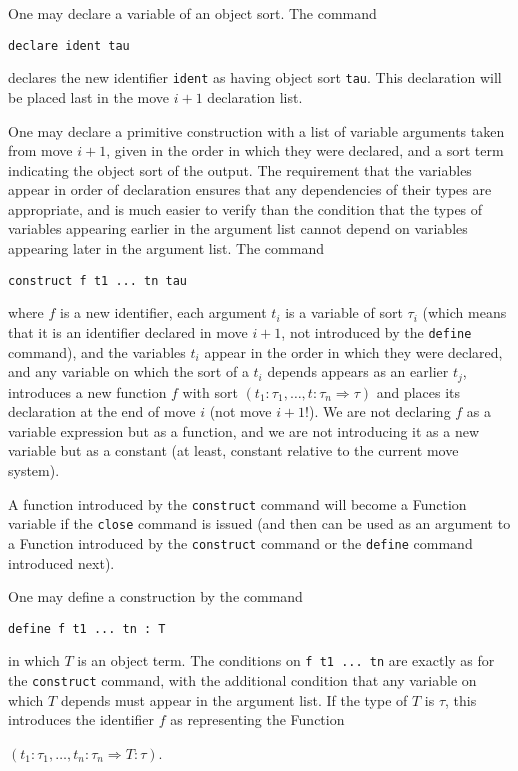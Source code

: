 \documentclass[12pt]{article}
\begin{document}
One may declare a variable of an object sort.  The command \begin{center}{\tt declare ident tau}\end{center} declares the new identifier {\tt ident} as having object sort {\tt tau}.  This declaration will be placed last in the move $i+1$ declaration list.

One may declare a primitive construction with a list of variable arguments taken from move $i+1$, given in the order in which they were declared, and a sort term indicating the object sort of the output.  The requirement that the variables appear in order of declaration ensures that any dependencies of their types are appropriate, and is much easier to verify than the condition that the types of variables appearing earlier in the argument list cannot depend on variables appearing later in the argument list.
The command \begin{center}{\tt construct f t1  ... tn tau}\end{center} where $f$ is a new identifier, each argument $t_i$ is a variable of sort $\tau_i$ (which means that it is an identifier declared in move $i+1$, not introduced by the {\tt define} command), and the variables $t_i$ appear in the order in which they were declared,  and any variable on which the sort of a $t_i$ depends appears as an earlier $t_j$,  introduces a new function $f$ with sort $(t_1:\tau_1,\ldots,t:\tau_n \Rightarrow \tau)$ and places its declaration at the end of move $i$ (not move $i+1$!).  We are not
declaring $f$ as a variable expression  but as a function, and we are not introducing it as a new variable but as a constant (at least, constant relative to the current move system).

A function introduced by the {\tt construct\/} command will become a Function variable if the {\tt close} command is issued (and then can be used as an argument to a Function introduced by the {\tt construct} command or the {\tt define} command introduced next).

One may define a construction by the command \begin{center}{\tt define f t1 ... tn : T}\end{center} in which $T$ is an object term.  The conditions on {\tt f t1 ... tn} are exactly as for the {\tt construct} command, with the additional condition that any variable on which $T$ depends must appear in the argument list.  If the type of $T$ is $\tau$, this introduces the identifier $f$ as
representing the Function \begin{center}$(t_1:\tau_1,\ldots,t_n:\tau_n \Rightarrow T:\tau)$.\end{center}
\end{document}
